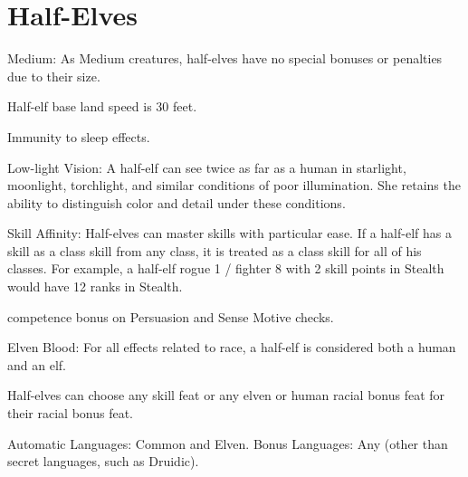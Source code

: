 \section{Half-Elves}
\begin{itemize*}
\item Medium: As Medium creatures, half-elves have no special bonuses or penalties due to their size.
\item Half-elf base land speed is 30 feet.
\item Immunity to sleep effects.
\item Low-light Vision: A half-elf can see twice as far as a human in starlight, moonlight, torchlight, and similar conditions of poor illumination. She retains the ability to distinguish color and detail under these conditions.
 \item Skill Affinity: Half-elves can master skills with particular ease. If a half-elf has a skill as a class skill from any class, it is treated as a class skill for all of his classes. For example, a half-elf rogue 1 / fighter 8 with 2 skill points in Stealth would have 12 ranks in Stealth.
\item {} competence bonus on Persuasion and Sense Motive checks.
\item Elven Blood: For all effects related to race, a half-elf is considered both a human and an elf.
\item Half-elves can choose any skill feat or any elven or human racial bonus feat for their racial bonus feat.
\item Automatic Languages: Common and Elven. Bonus Languages: Any (other than secret languages, such as Druidic).
\end{itemize*}

